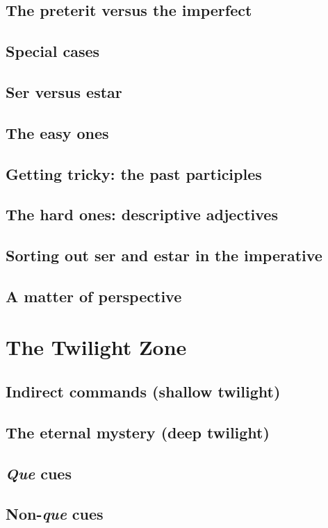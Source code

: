 \section{The preterit versus the imperfect}
\section{Special cases}
\section{Ser versus estar}
\section{The easy ones}
\section{Getting tricky: the past participles}
\section{The hard ones: descriptive adjectives}
\section{Sorting out ser and estar in the imperative}
\section{A matter of perspective}

\chapter{The Twilight Zone}

\section{Indirect commands (shallow twilight)}
\section{The eternal mystery (deep twilight)}
\section{\textit{Que} cues}
\section{Non-\textit{que} cues}
